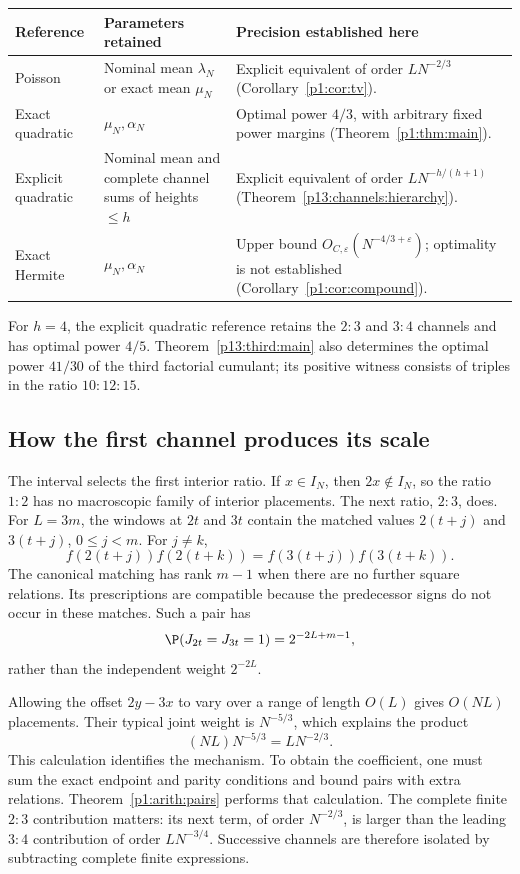 \begin{center}
\small
\begin{tabularx}{\linewidth}
  {@{}p{.20\linewidth}p{.25\linewidth}X@{}}
\toprule
Reference & Parameters retained & Precision established here\\
\midrule
Poisson
& Nominal mean $\lambda_N$ or exact mean $\mu_N$
& Explicit equivalent of order $LN^{-2/3}$
  (Corollary~\ref{p1:cor:tv}).\\[3pt]
Exact quadratic
& $\mu_N,\alpha_N$
& Optimal power $4/3$, with arbitrary fixed power margins
  (Theorem~\ref{p1:thm:main}).\\[3pt]
Explicit quadratic
& Nominal mean and complete channel sums of heights $\le h$
& Explicit equivalent of order $LN^{-h/(h+1)}$
  (Theorem~\ref{p13:channels:hierarchy}).\\[3pt]
Exact Hermite
& $\mu_N,\alpha_N$
& Upper bound $O_{C,\varepsilon}(N^{-4/3+\varepsilon})$;
  optimality is not established
  (Corollary~\ref{p1:cor:compound}).\\
\bottomrule
\end{tabularx}
\end{center}

For $h=4$, the explicit quadratic reference retains the $2:3$ and $3:4$
channels and has optimal power $4/5$.
Theorem~\ref{p13:third:main} also determines the optimal power $41/30$
of the third factorial cumulant; its positive witness consists of
triples in the ratio $10:12:15$.

\subsection{How the first channel produces its scale}
\label{p1:intro:mechanism}

The interval selects the first interior ratio. If \(x\in I_N\),
then \(2x\notin I_N\), so the ratio \(1:2\) has no macroscopic
family of interior placements. The next ratio, \(2:3\), does.
For \(L=3m\), the windows at \(2t\) and \(3t\) contain the matched
values \(2(t+j)\) and \(3(t+j)\), \(0\le j<m\). For \(j\ne k\),
\[
 f(2(t+j))f(2(t+k))=f(3(t+j))f(3(t+k)).
\]
The canonical matching has rank \(m-1\) when there are no further
square relations. Its prescriptions are compatible because the
predecessor signs do not occur in these matches. Such a pair has
\[
 \P(J_{2t}=J_{3t}=1)=2^{-2L+m-1},
\]
rather than the independent weight \(2^{-2L}\).

Allowing the offset \(2y-3x\) to vary over a range of length
\(O(L)\) gives \(O(NL)\) placements. Their typical joint weight is
\(N^{-5/3}\), which explains the product
\[
             (NL)N^{-5/3}=LN^{-2/3}.
\]
This calculation identifies the mechanism. To obtain the coefficient,
one must sum the exact endpoint and parity conditions and bound pairs
with extra relations. Theorem~\ref{p1:arith:pairs} performs that
calculation. The complete finite \(2:3\) contribution matters:
its next term, of order \(N^{-2/3}\), is larger than the leading
\(3:4\) contribution of order \(LN^{-3/4}\). Successive channels
are therefore isolated by subtracting complete finite expressions.


